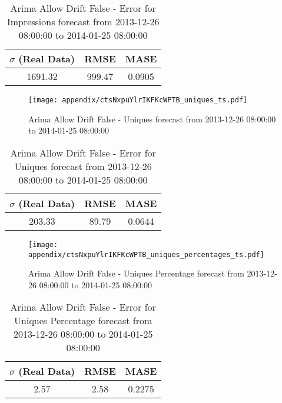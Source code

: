 \begin{table}[H]
\centering
\footnotesize
\begin{tabular}{ccc}
$\sigma$ (Real Data) & RMSE & MASE   \\ \hline
1691.32 & 999.47 & 0.0905 \\
\end{tabular}

\vspace{0.5cm}

\caption[]{
Arima Allow Drift False - Error for Impressions forecast from 2013-12-26 08:00:00 to 2014-01-25 08:00:00}
\end{table}

\begin{figure}[H] \begin{center} \leavevmode
\texttt{[image: appendix/ctsNxpuYlrIKFKcWPTB\_uniques\_ts.pdf]} \caption[]{
Arima Allow Drift False - Uniques forecast from 2013-12-26 08:00:00 to 2014-01-25 08:00:00} \label{fig:appendix/ctsNxpuYlrIKFKcWPTB_uniques_ts.pdf} \end{center}
\end{figure}

\begin{table}[H]
\centering
\footnotesize
\begin{tabular}{ccc}
$\sigma$ (Real Data) & RMSE & MASE   \\ \hline
203.33 & 89.79 & 0.0644 \\
\end{tabular}

\vspace{0.5cm}

\caption[]{
Arima Allow Drift False - Error for Uniques forecast from 2013-12-26 08:00:00 to 2014-01-25 08:00:00}
\end{table}

\begin{figure}[H] \begin{center} \leavevmode
\texttt{[image: appendix/ctsNxpuYlrIKFKcWPTB\_uniques\_percentages\_ts.pdf]} \caption[]{
Arima Allow Drift False - Uniques Percentage forecast from 2013-12-26 08:00:00 to 2014-01-25 08:00:00} \label{fig:appendix/ctsNxpuYlrIKFKcWPTB_uniques_percentages_ts.pdf} \end{center}
\end{figure}

\begin{table}[H]
\centering
\footnotesize
\begin{tabular}{ccc}
$\sigma$ (Real Data) & RMSE & MASE   \\ \hline
2.57 & 2.58 & 0.2275 \\
\end{tabular}

\vspace{0.5cm}

\caption[]{
Arima Allow Drift False - Error for Uniques Percentage forecast from 2013-12-26 08:00:00 to 2014-01-25 08:00:00}
\end{table}

